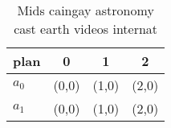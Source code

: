 \documentclass[a4paper]{article}
\begin{document}
\begin{table}
\begin{adjustbox}{width=0.6\columnwidth}
\begin{tabular}{|l|l|l|l|}
\hline
\textbf{plan} & \multicolumn{1}{c|}{\textbf{0}} & \multicolumn{1}{c|}{\textbf{1}} & \multicolumn{1}{c|}{\textbf{2}} \\ \hline
\textbf{$a_0$}  & (0,0) & (1,0) & (2,0) \\ \hline
\textbf{$a_1$}  & (0,0) & (1,0) & (2,0) \\ \hline
\end{tabular}
\end{adjustbox}
\caption{Mids caingay astronomy cast earth videos internat
}
\end{table}
\end{document}
